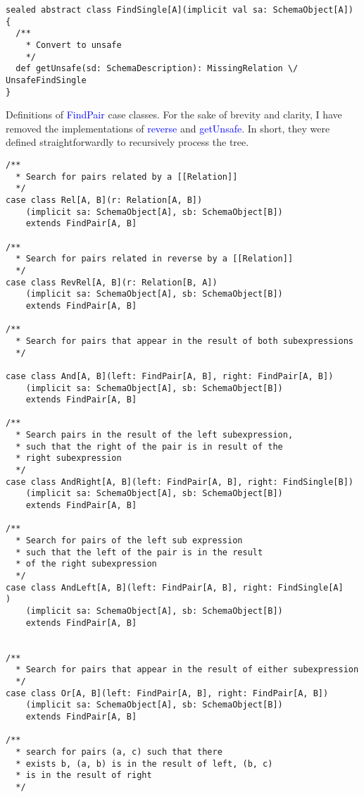 \documentclass[12pt,a4paper,twoside,openright]{report}
\newcommand\codeName[1]{\textcolor{blue}{#1}}
\begin{document}
{{\begin{framed}
\begin{verbatim}
sealed abstract class FindSingle[A](implicit val sa: SchemaObject[A]) {
  /**
    * Convert to unsafe
    */
  def getUnsafe(sd: SchemaDescription): MissingRelation \/ UnsafeFindSingle
}
\end{verbatim}
\end{framed}

Definitions of \codeName{FindPair} case classes.
For the sake of brevity and clarity, I have removed the implementations of \codeName{reverse} and \codeName{getUnsafe}. In short, they were defined straightforwardly to recursively process the tree.
\begin{framed}
\begin{verbatim}
/**
  * Search for pairs related by a [[Relation]]
  */
case class Rel[A, B](r: Relation[A, B])
    (implicit sa: SchemaObject[A], sb: SchemaObject[B])
    extends FindPair[A, B]

/**
  * Search for pairs related in reverse by a [[Relation]]
  */
case class RevRel[A, B](r: Relation[B, A])
    (implicit sa: SchemaObject[A], sb: SchemaObject[B])
    extends FindPair[A, B]

/**
  * Search for pairs that appear in the result of both subexpressions
  */

case class And[A, B](left: FindPair[A, B], right: FindPair[A, B])
    (implicit sa: SchemaObject[A], sb: SchemaObject[B])
    extends FindPair[A, B]

/**
  * Search pairs in the result of the left subexpression,
  * such that the right of the pair is in result of the
  * right subexpression
  */
case class AndRight[A, B](left: FindPair[A, B], right: FindSingle[B])
    (implicit sa: SchemaObject[A], sb: SchemaObject[B])
    extends FindPair[A, B]

/**
  * Search for pairs of the left sub expression
  * such that the left of the pair is in the result
  * of the right subexpression
  */
case class AndLeft[A, B](left: FindPair[A, B], right: FindSingle[A]                        )
    (implicit sa: SchemaObject[A], sb: SchemaObject[B])
    extends FindPair[A, B]


/**
  * Search for pairs that appear in the result of either subexpression
  */
case class Or[A, B](left: FindPair[A, B], right: FindPair[A, B])
    (implicit sa: SchemaObject[A], sb: SchemaObject[B])
    extends FindPair[A, B]

/**
  * search for pairs (a, c) such that there
  * exists b, (a, b) is in the result of left, (b, c)
  * is in the result of right
  */


\end{verbatim}
\end{framed}}}
\end{document}
